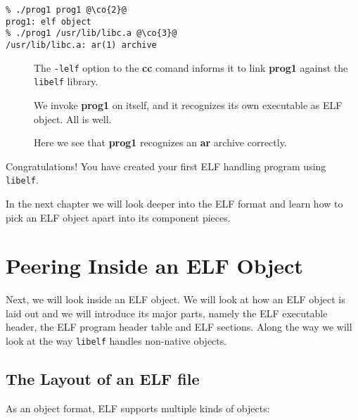 \documentclass[a4paper,pdftex]{book}
\makeatletter
\newcommand{\library}[1]{\texttt{#1}}
\newcommand{\parameter}[1]{\texttt{#1}}
\newcommand{\tool}[1]{\textbf{#1}}
\newenvironment{callout}[2][black]{%
  \begingroup\newcommand{\@cocolor}{#1}%
  \setlength{\shadowsize}{1.2pt}%
  \newcommand{\@cogroup}[1]{#2}}{\endgroup}
\newcommand{\@co}[1]{\shadowbox{\color{\@cocolor}#1}}
\newcommand{\co}[1]{%
  \hypertarget{\@cogroup.#1.co}{%
    \hyperlink{\@cogroup.#1.cr}{\@co{#1}}}}
\newcommand{\coref}[1]{%
  \hypertarget{\@cogroup.#1.cr}{%
    \hyperlink{\@cogroup.#1.co}{\@co{#1}}}}
\makeatother
\begin{document}
\begin{callout}{scr1}
  \begin{lstlisting}[basicstyle=\ttfamily, language={},
      caption=Compiling and running prog1,
      label=scr.prog1]
% cc -o prog1 prog1.c -lelf @\co{1}@
% ./prog1 prog1 @\co{2}@
prog1: elf object
% ./prog1 /usr/lib/libc.a @\co{3}@
/usr/lib/libc.a: ar(1) archive
  \end{lstlisting}

  \begin{description}
  \item[\coref{1}] The \parameter{-lelf} option to the \tool{cc} comand
    informs it to link \tool{prog1} against the \library{libelf}
    library.
  \item[\coref{2}] We invoke \tool{prog1} on itself, and it recognizes
    its own executable as ELF object.  All is well.
  \item[\coref{3}] Here we see that \tool{prog1} recognizes an \tool{ar}
    archive correctly.
  \end{description}
\end{callout}

Congratulations!  You have created your first ELF handling program
using \library{libelf}.

In the next chapter we will look deeper into the ELF format and learn
how to pick an ELF object apart into its component pieces.

\chapter{Peering Inside an ELF Object}\label{chap.peering-inside}

Next, we will look inside an ELF object.  We will look at how an ELF
object is laid out and we will introduce its major parts, namely the
ELF executable header, the ELF program header table and ELF sections.
Along the way we will look at the way \library{libelf} handles
non-native objects.

\section{The Layout of an ELF file}

As an object format, ELF supports multiple kinds of objects:
\end{document}
